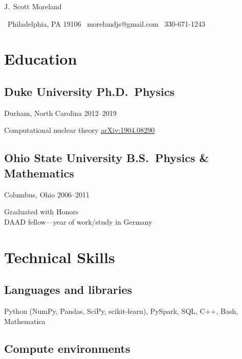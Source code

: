 \documentclass[letterpaper,10pt]{article}
\begin{document}
\newcommand{\sep}{{\quad\textbar\quad}}

\begin{center}
  {\huge\raleway J.\ Scott Moreland}
\end{center}

\begin{center}
  \small
  \, Philadelphia, PA 19106 \sep
  \, morelandjs@gmail.com \sep
  \, 330-671-1243
\end{center}

\smallskip

\newcommand{\subheading}[3]{{\small #1 \hfill #2--#3}}

\begin{multicols}{2}

\section{Education}

\subsection{Duke University \hfill Ph.D.\ Physics}
\subheading{Durham, North Carolina}{2012}{2019}

Computational nuclear theory \hfill
\href{https://arxiv.org/abs/1904.08290}{\small arXiv:1904.08290}

\subsection{Ohio State University \hfill B.S.\ Physics \& Mathematics}
\subheading{Columbus, Ohio}{2006}{2011}

Graduated with Honors\\
DAAD fellow---year of work/study in Germany

\section{Technical Skills}

\subsection{Languages and libraries}
\smallskip

Python (NumPy, Pandas, SciPy, scikit-learn), PySpark, SQL, C++, Bash,
Mathematica

\subsection{Compute environments}
\smallskip


\end{multicols}
\end{document}
